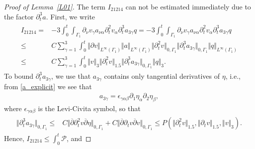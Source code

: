 \documentclass[10pt,reqno]{amsart}
\theoremstyle{plain}
\theoremstyle{definition}
\numberwithin{equation}{section}
\newcommand{\ccP}{\mathscr{P}}
\newcommand{\al}{\alpha}
\newcommand{\be}{\beta}
\newcommand{\ga}{\gamma}
\newcommand{\Ga}{\Gamma}
\newcommand{\norm}[1]{\Vert#1\Vert}
\begin{document}
\begin{proof}[Proof of Lemma~\ref{L01}]
The term $I_{21214}$ can not be estimated immediately
due to the factor $\partial_{t}^{3}a$.
First, we write
\begin{align}
\begin{split}
I_{21214} = & 
-3\int_0^t \int_{\Ga_1}  \partial_\nu v_\ga a_{\nu \al} \partial^2_t v_\al \partial^3_t a_{3 \ga}  q
=
-3\int_0^t \int_{\Ga_1}  
\partial_\nu v_\ga 
a_{\nu \al} 
\partial^2_t v_\al 
\partial^3_t a_{3 \ga}
 q
\\
\leq &
C \sum_{\ga=1}^3  \int_0^t 
\norm{ \partial v}_{L^\infty(\Ga_1)}
\norm{ a}_{L^\infty(\Ga_1)}
\norm{ \partial^2_t v}_{0,\Ga_1}
\norm{ \partial^3_t a_{3 \ga}}_{0,\Ga_1}
\norm{ q}_{L^\infty(\Ga_1)}
\\
\leq & 
C\sum_{\ga=1}^3 
\int_0^t
\norm{v}_3 
\norm{ \partial^2_t v}_{1.5} 
\norm{ \partial^3_t a_{3 \ga}}_{0,\Ga_1}
\norm{q}_3.
\end{split}
\nonumber
\end{align}
To bound $\partial^3_t a_{3 \ga}$, we use that $a_{3\ga}$ contains
only tangential derivatives of $\eta$, i.e., from \eqref{a_explicit} we see that
\begin{gather}
a_{3\ga} = \epsilon_{\ga \al \be} \partial_1 \eta_\al \partial_2 \eta_\be,
\label{a_3_ga_bry}
\end{gather}
where $\epsilon_{\ga \al \be}$ is the Levi-Civita symbol,
so that 
\begin{align}
\begin{split}
\norm{\partial^3_t a_{3\ga} }_{0,\Ga_1} 
\leq & C \norm{ \overline{\partial} \partial^2_t v \overline{\partial} \eta}_{0,\Ga_1}
+
C \norm{ \overline{\partial} \partial_t v \overline{\partial} v}_{0,\Ga_1}
\leq
P (\norm{\partial^2_t v}_{1.5}, \norm{\partial_t v}_{1.5},\norm{v}_3 ).
\end{split}
\nonumber
\end{align}
Hence,
$
I_{21214} \leq 
\int_0^t \ccP
$, and 

\end{proof}
\end{document}
